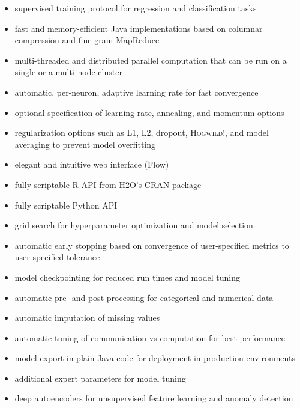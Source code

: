 \begin{itemize}

\item supervised training protocol for regression and classification tasks

\item fast and memory-efficient Java implementations based on columnar compression and fine-grain MapReduce

\item multi-threaded and distributed parallel computation that can be run on a single or a multi-node cluster

\item automatic, per-neuron, adaptive learning rate for fast convergence

\item optional specification of learning rate, annealing, and momentum options

\item regularization options such as L1, L2, dropout, \textsc{Hogwild!}, and model averaging to prevent model overfitting

\item elegant and intuitive web interface (Flow)

\item fully scriptable R API from H2O's CRAN package

\item fully scriptable Python API

\item grid search for hyperparameter optimization and model selection

\item automatic early stopping based on convergence of user-specified metrics to user-specified tolerance

\item model checkpointing for reduced run times and model tuning

\item automatic pre- and post-processing for categorical and numerical data

\item automatic imputation of missing values

\item automatic tuning of communication vs computation for best performance  %

\item model export in plain Java code for deployment in production environments

\item additional expert parameters for model tuning

\item deep autoencoders for unsupervised feature learning and anomaly detection 

\end{itemize}

